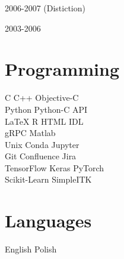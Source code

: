 \documentclass[]{mbcv}
\begin{document}
{\begin{minipage}[t][0.85\textheight]{0.3\textwidth}
2006-2007 (Distiction)
\sectionsep

2003-2006

\vspace*{5pt}

\sectionsep
\section{Programming}
\vspace{5pt}
 C \textbullet{}  C++ \textbullet{} Objective-C  \\
Python \textbullet{} Python-C API   \\
 \LaTeX \textbullet{} R \textbullet{} HTML \textbullet{} IDL\\
 gRPC \textbullet{} Matlab\\
 
\vspace{5pt}
Unix \textbullet{} Conda \textbullet{} Jupyter  \\
Git \textbullet{} Confluence \textbullet{} Jira \\

\vspace{5pt}
TensorFlow \textbullet{} Keras \textbullet{} PyTorch  \\
Scikit-Learn \textbullet{} SimpleITK

\vspace*{5pt}
\sectionsep
\section{Languages}
English \textbullet{} Polish

\end{minipage}}%
\hfill
\end{document}
